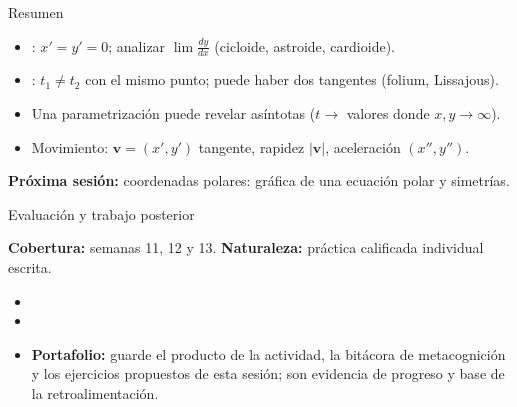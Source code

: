 \documentclass[10pt,aspectratio=169]{beamer}
\begin{document}
\begin{frame}{Resumen}
  \begin{itemize}
    \item {}: $x'=y'=0$; analizar $\lim\frac{dy}{dx}$ (cicloide, astroide, cardioide).
    \item {}: $t_1\neq t_2$ con el mismo punto; puede haber dos tangentes (folium, Lissajous).
    \item Una parametrización puede revelar asíntotas ($t\to$ valores donde $x,y\to\infty$).
    \item Movimiento: $\mathbf v=(x',y')$ tangente, rapidez $|\mathbf v|$, aceleración $(x'',y'')$.
  \end{itemize}
  \vspace{3mm}
  \textbf{Próxima sesión:} coordenadas polares: gráfica de una ecuación polar y simetrías.
\end{frame}


\begin{frame}{Evaluación y trabajo posterior}
  \small
  \begin{evalbox}
    \textbf{Cobertura:} semanas 11, 12 y 13. \textbf{Naturaleza:} práctica calificada individual escrita.
  \end{evalbox}
  \begin{itemize}
    \item \criterios
    \item \declaracionia
    \item \textbf{Portafolio:} guarde el producto de la actividad, la bitácora de metacognición y los ejercicios propuestos de esta sesión; son evidencia de progreso y base de la retroalimentación.
  \end{itemize}
\end{frame}
\end{document}
